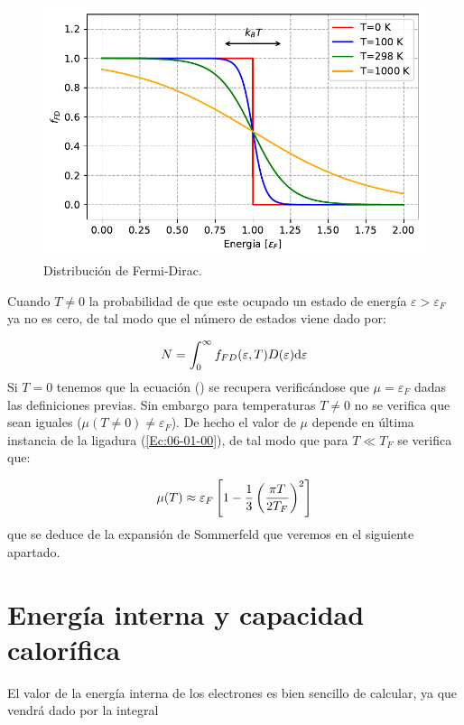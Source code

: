 \begin{figure}[h!] \centering
	\includegraphics[scale=0.85]{Cuerpo/Ch_06/06-Fermi-Dirac.pdf}
	\caption{Distribución de Fermi-Dirac.}
	\label{Fig:06-0}
\end{figure}    
Cuando $T\neq0$ la probabilidad de que este ocupado un estado de energía $\varepsilon>\varepsilon_F$ ya no es cero, de tal modo que el número de estados viene dado por:

\begin{equation}
	N=\int_{0}^{\infty} f_{FD}(\varepsilon,T) D(\varepsilon) \mathrm{d} \varepsilon \label{Ec:06-01-00}
\end{equation}
Si $T=0$ tenemos que la ecuación () se recupera verificándose que $\mu=\varepsilon_F$ dadas las definiciones previas. Sin embargo para temperaturas $T\neq 0$ no se verifica que sean iguales ($\mu(T\neq 0) \neq \varepsilon_F$). De hecho el valor de $\mu$ depende en última instancia de la ligadura (\ref{Ec:06-01-00}), de tal modo que para $T\ll T_F$ se verifica que:

\begin{equation}
	\mu(T) \approx \varepsilon_F \left[ 1-\frac{1}{3}\left( \frac{\pi T}{2T_F} \right)^2 \right]
\end{equation}
que se deduce de la expansión de Sommerfeld que veremos en el siguiente apartado.

\section{Energía interna y capacidad calorífica}

El valor de la energía interna de los electrones es bien sencillo de calcular, ya que vendrá dado por la integral

